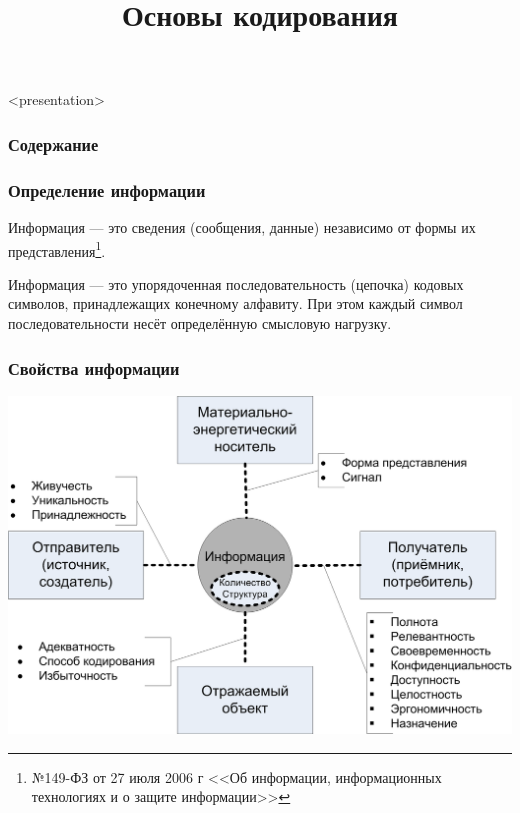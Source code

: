 


\title{Основы кодирования}





\begin{frame}<presentation>
    \frametitle{Содержание}
    \tableofcontents
\end{frame}


\begin{frame}
    \frametitle{Определение информации}
    
    \begin{definition}[Юридическое]
        \alert{Информация} --- это сведения (сообщения, данные) независимо от формы их представления\footnote{№149-ФЗ от 27 июля 2006 г <<Об информации, информационных технологиях и о защите информации>>}.
    \end{definition}
    
    \begin{definition}
        \alert{Информация} --- это упорядоченная последовательность (цепочка) \alert{кодовых символов}, принадлежащих конечному алфавиту. При этом каждый символ последовательности несёт определённую смысловую нагрузку.
    \end{definition}
\end{frame}


\begin{frame}
    \frametitle{Свойства информации}

    \begin{center}
        \includegraphics[width=.75\textwidth]{fig/iproperties}
    \end{center}
\end{frame}

